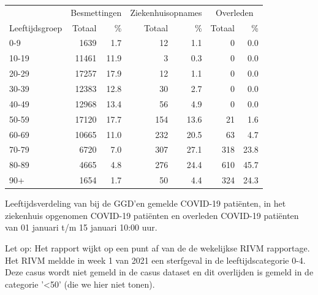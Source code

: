 \documentclass[
  english,
  man,floatsintext]{apa6}
\begin{document}
\begin{table}[H]
\centering\begingroup\fontsize{11}{13}\selectfont

\begin{threeparttable}
\begin{tabular}{lrrrrrr}
\toprule
\multicolumn{1}{c}{ } & \multicolumn{2}{c}{Besmettingen} & \multicolumn{2}{c}{Ziekenhuisopnames} & \multicolumn{2}{c}{Overleden} \\
\cmidrule(l{3pt}r{3pt}){2-3} \cmidrule(l{3pt}r{3pt}){4-5} \cmidrule(l{3pt}r{3pt}){6-7}
Leeftijdsgroep & Totaal & \% & Totaal & \% & Totaal & \%\\
\midrule
0-9 & 1639 & 1.7 & 12 & 1.1 & 0 & 0.0\\
10-19 & 11461 & 11.9 & 3 & 0.3 & 0 & 0.0\\
20-29 & 17257 & 17.9 & 12 & 1.1 & 0 & 0.0\\
30-39 & 12383 & 12.8 & 30 & 2.7 & 0 & 0.0\\
40-49 & 12968 & 13.4 & 56 & 4.9 & 0 & 0.0\\
50-59 & 17120 & 17.7 & 154 & 13.6 & 21 & 1.6\\
60-69 & 10665 & 11.0 & 232 & 20.5 & 63 & 4.7\\
70-79 & 6720 & 7.0 & 307 & 27.1 & 318 & 23.8\\
80-89 & 4665 & 4.8 & 276 & 24.4 & 610 & 45.7\\
90+ & 1654 & 1.7 & 50 & 4.4 & 324 & 24.3\\
\bottomrule
\end{tabular}
\begin{tablenotes}
\item[1] Leeftijdsverdeling van bij de GGD’en gemelde COVID-19 patiënten, in het ziekenhuis opgenomen COVID-19 patiënten en overleden COVID-19 patiënten van 01 januari t/m 15 januari 10:00 uur.
\item[2] Let op: Het rapport wijkt op een punt af van de de wekelijkse RIVM rapportage. Het RIVM meldde in week 1 van 2021 een sterfgeval in de leeftijdscategorie 0-4. Deze casus wordt niet gemeld in de casus dataset en dit overlijden is gemeld in de categorie '<50' (die we hier niet tonen).
\end{tablenotes}
\end{threeparttable}
\endgroup{}
\end{table}

\newpage
\end{document}
